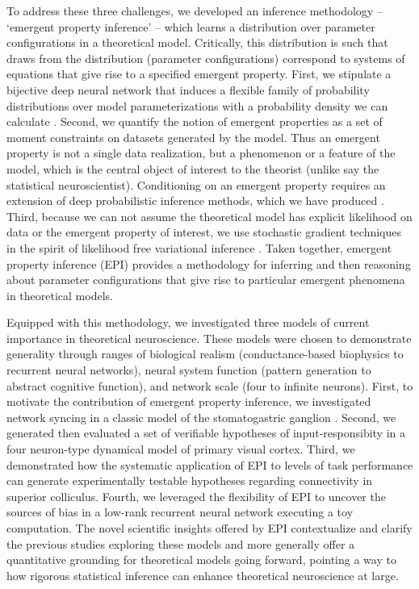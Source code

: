 \documentclass[11pt]{article}
\begin{document}
To address these three challenges, we developed an inference methodology -- `emergent property inference' -- which learns a distribution over parameter configurations in a theoretical model.  Critically, this distribution is such that draws from the distribution (parameter configurations) correspond to systems of equations that give rise to a specified emergent property.  
First, we stipulate a bijective deep neural network that induces a flexible family of probability distributions over model parameterizations with a probability density we can calculate \cite{rezende2015variational, dinh2016density, papamakarios2017masked}.
Second, we quantify the notion of emergent properties as a set of moment constraints on datasets generated by the model.  
Thus an emergent property is not a single data realization, but a phenomenon or a feature of the model, which is the central object of interest to the theorist (unlike say the statistical neuroscientist).  
Conditioning on an emergent property requires an extension of deep probabilistic inference methods, which we have produced \cite{loaiza2017maximum}.
Third,  because we can not assume the theoretical model has explicit likelihood on data or the emergent property of interest, we use stochastic gradient techniques in the spirit of likelihood free variational inference \cite{tran2017hierarchical}.    
Taken together, emergent property inference (EPI) provides a methodology for inferring and then reasoning about parameter configurations that give rise to particular emergent phenomena in theoretical models.

Equipped with this methodology, we investigated three models of current importance in theoretical neuroscience.
These models were chosen to demonstrate generality through ranges of biological realism (conductance-based biophysics to recurrent neural networks), neural system function (pattern generation to abstract cognitive function), and network scale (four to infinite neurons).
First, to motivate the contribution of emergent property inference, we investigated network syncing in a classic model of the stomatogastric ganglion \cite{gutierrez2013multiple}.   
Second, we generated then evaluated a set of verifiable hypotheses of input-responsibity in a four neuron-type dynamical model of primary visual cortex.
Third, we demonstrated how the systematic application of EPI to levels of task performance can generate experimentally testable hypotheses regarding connectivity in superior colliculus.  
Fourth, we leveraged the flexibility of EPI to uncover the sources of bias in a low-rank recurrent neural network executing a toy computation.  
The novel scientific insights offered by EPI contextualize and clarify the previous studies exploring these models \cite{gutierrez2013multiple, litwin2016inhibitory, duan2018collicular, mastrogiuseppe2018linking} and more generally offer a quantitative grounding for theoretical models  going forward, pointing a way to how rigorous statistical inference can enhance theoretical neuroscience at large.
\end{document}
